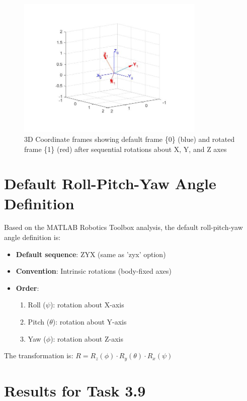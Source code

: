 \documentclass[11pt,a4paper]{article}
\begin{document}
\begin{figure}[H]
    \centering
    \includegraphics[width=0.8\textwidth]{task_2.jpg}
    \caption{3D Coordinate frames showing default frame \{0\} (blue) and rotated frame \{1\} (red) after sequential rotations about X, Y, and Z axes}
\end{figure}

\section{Default Roll-Pitch-Yaw Angle Definition}

Based on the MATLAB Robotics Toolbox analysis, the default roll-pitch-yaw angle definition is:
\begin{itemize}
    \item \textbf{Default sequence}: ZYX (same as 'zyx' option)
    \item \textbf{Convention}: Intrinsic rotations (body-fixed axes)
    \item \textbf{Order}: 
    \begin{enumerate}
        \item Roll ($\psi$): rotation about X-axis
        \item Pitch ($\theta$): rotation about Y-axis  
        \item Yaw ($\phi$): rotation about Z-axis
    \end{enumerate}
\end{itemize}

The transformation is: $R = R_z(\phi) \cdot R_y(\theta) \cdot R_x(\psi)$

\section{Results for Task 3.9}
\end{document}
